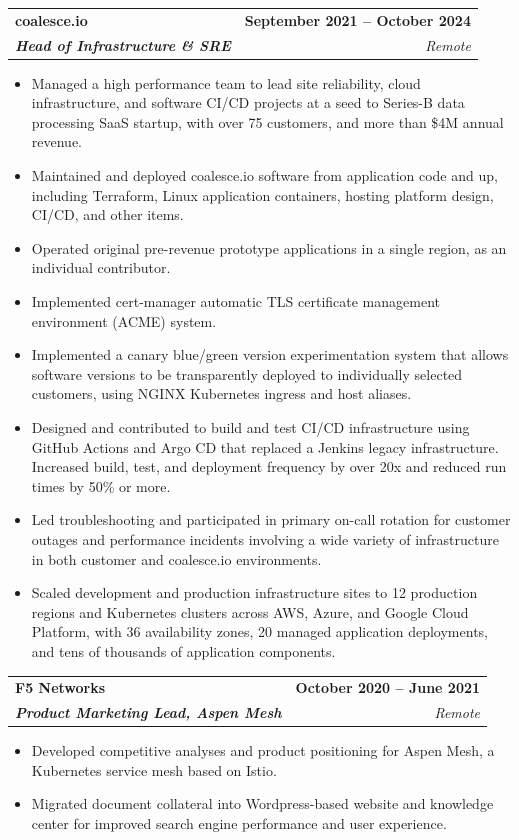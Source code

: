 \documentclass[letterpaper,11pt]{article}
\makeatletter
\newcommand{\resumeItem}[1]{
  \item\footnotesize{
    {#1 \vspace{-2pt}}
  }
}
\newcommand{\resumeCompanyHeading}[4]{
  \vspace{-2pt}\item
    \begin{tabular*}{0.97\textwidth}[t]{l@{\extracolsep{\fill}}r}
      \textbf{\small#1} & \textbf{\small#2} \\
      \textbf{\textit{\small#3}} & \textit{\small #4} \\
    \end{tabular*}\vspace{-7pt}
}
\newcommand{\resumeSubSubheading}[2]{
    \item
    \begin{tabular*}{0.97\textwidth}[t]{l@{\extracolsep{\fill}}r}
      \textbf{\textit{\small#1}} & \\
      \textit{\small#2} & \\
    \end{tabular*}\vspace{-7pt}
}
\newcommand{\resumeSubHeadingListEnd}{\end{itemize}}
\newcommand{\resumeItemListStart}{\begin{itemize}}
\newcommand{\resumeItemListEnd}{\end{itemize}\vspace{-5pt}}
\makeatother
\begin{document}
    \resumeCompanyHeading
      {coalesce.io}{September 2021 -- October 2024}
      {Head of Infrastructure \& SRE}{Remote}
      \resumeItemListStart
        \resumeItem{Managed a high performance team to lead site reliability, cloud infrastructure, and software CI/CD projects at a seed to Series-B data processing SaaS startup, with over 75 customers, and more than \$4M annual revenue.}
        \resumeItem{Maintained and deployed coalesce.io software from application code and up, including Terraform, Linux application containers, hosting platform design, CI/CD, and other items.}
        \resumeItem{Operated original pre-revenue prototype applications in a single region, as an individual contributor.}
        \resumeItem{Implemented cert-manager automatic TLS certificate management environment (ACME) system.}
        \resumeItem{Implemented a canary blue/green version experimentation system that allows software versions to be transparently deployed to individually selected customers, using NGINX Kubernetes ingress and host aliases.}
        \resumeItem{Designed and contributed to build and test CI/CD infrastructure using GitHub Actions and Argo CD that replaced a Jenkins legacy infrastructure. Increased build, test, and deployment frequency by over 20x and reduced run times by 50\% or more.}
        \resumeItem{Led troubleshooting and participated in primary on-call rotation for customer outages and performance incidents involving a wide variety of infrastructure in both customer and coalesce.io environments.}
        \resumeItem{Scaled development and production infrastructure sites to 12 production regions and Kubernetes clusters across AWS, Azure, and Google Cloud Platform, with 36 availability zones, 20 managed application deployments, and tens of thousands of application components.}
      \resumeItemListEnd
      

    \resumeCompanyHeading
      {F5 Networks}{October 2020 -- June 2021}
      {Product Marketing Lead, Aspen Mesh}{Remote}
      \resumeItemListStart
        \resumeItem{Developed competitive analyses and product positioning for Aspen Mesh, a Kubernetes service mesh based on Istio.}
        \resumeItem{Migrated document collateral into Wordpress-based website and knowledge center for improved search engine performance and user experience.}
      \resumeItemListEnd
\end{document}
